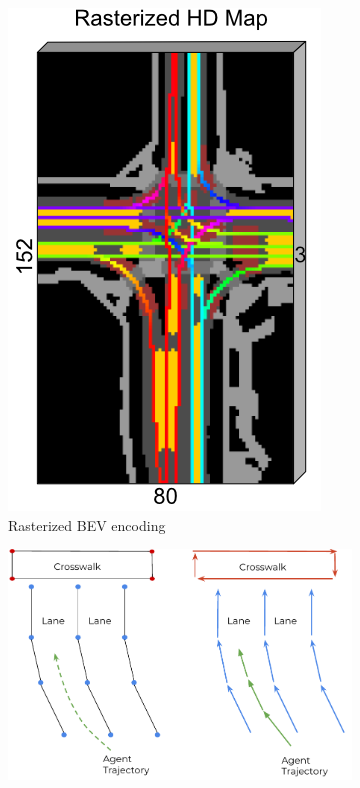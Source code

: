 \begin{figure}[H]
\centering
\begin{subfigure}[t]{0.35\textwidth}
    \centering
    \includegraphics[width=\textwidth]{figures/caspnet-bev-repr.png}
    \caption{Rasterized BEV encoding}
    \label{fig:rasterized}
\end{subfigure}
\hfill
\begin{subfigure}[t]{0.37\textwidth}
    \centering
    \includegraphics[width=\textwidth]{figures/vectornet-2020-vector-repr.pdf}

\end{subfigure}
\end{figure}
